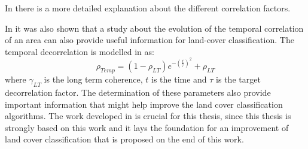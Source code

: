 In \cite{Krieger} there is a more detailed explanation about the different correlation factors.


In \cite{Paolo} it was also shown that a study about the evolution of the temporal correlation of an area can also provide useful information for land-cover classification. The temporal decorrelation is modelled in \cite{Paolo} as:
\begin{equation}
    \rho_{Temp} = (1-\rho_{LT})e^{-(\frac{t}{\tau})^2} + \rho_{LT}
\end{equation}{}
where $\gamma_{LT}$ is the long term coherence, $t$ is the time and $\tau$ is the target decorrelation factor. The determination of these parameters also provide  important information that might help improve the land cover classification algorithms. The work developed in \cite{Paolo} is crucial for this thesis, since this thesis is strongly based on this work and it lays the foundation for an improvement of land cover classification that is proposed on the end of this work.


